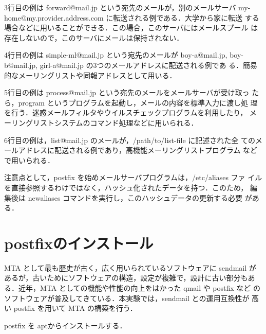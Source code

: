 3行目の例は forward@mail.jp という宛先のメールが，別のメールサーバ
my-home@my.provider.address.com に転送される例である．大学から家に転送
する場合などに用いることができる．この場合，このサーバにはメールスプール
は存在しないので，このサーバにメールは保持されない．

4行目の例は simple-ml@mail.jp という宛先のメールが boy-a@mail.jp,
boy-b@mail.jp, girl-a@mail.jp の3つのメールアドレスに配送される例であ
る．簡易的なメーリングリストや同報アドレスとして用いる．

5行目の例は process@mail.jp という宛先のメールをメールサーバが受け取っ
たら，program というプログラムを起動し，メールの内容を標準入力に渡し処
理を行う．迷惑メールフィルタやウイルスチェックプログラムを利用したり，
メーリングリストシステムのコマンド処理などに用いられる．

6行目の例は，list@mail.jp のメールが，/path/to/list-file に記述された全
てのメールアドレスに配送される例であり，高機能メーリングリストプログラム
などで用いられる．

注意点として，postfix を始めメールサーバプログラムは，/etc/aliases ファ
イルを直接参照するわけではなく，ハッシュ化されたデータを持つ．このため，
編集後は newaliases コマンドを実行し，このハッシュデータの更新する必要
がある．

%
%
\section{postfixのインストール}
MTA として最も歴史が古く，広く用いられているソフトウェアに sendmail が
あるが，古いためにソフトウェアの構造，設定が複雑で，設計に古い部分もあ
る．近年，MTA としての機能や性能の向上をはかった qmail や postfix など
のソフトウェアが普及してきている．本実験では，sendmail との運用互換性が
高い postfix を用いて MTA の構築を行う．


postfix を aptからインストールする．


